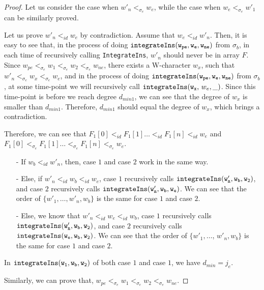 \begin {proof}
Let us consider the case when $w'_n <_{\sigma_e} w_e$, while the case when $w_e <_{\sigma_e} w'_1$ can be similarly proved.

Let us prove $w'_n <_{id} w_e$ by contradiction. Assume that $w_e <_{id} w'_n$. Then, it is easy to see that, in the process of doing $\alabelshort[{\tt integrateIns}]{w_{pe},w_e,w_{ne}}$ from $\sigma_b$, in each time of recursively calling {\tt IntegrateIns}, $w'_n$ should never be in array $F$. Since $w_{pe} <_{\sigma_e} w_1 <_{\sigma_e} w_2 <_{\sigma_e} w_{ne}$, there exists a W-character $w_x$, such that $w'_n <_{\sigma_e} w_x <_{\sigma_e} w_e$, and in the process of doing $\alabelshort[{\tt integrateIns}]{w_{pe},w_e,w_{ne}}$ from $\sigma_b$, at some time-point we will recursively call $\alabelshort[{\tt integrateIns}]{w_x$, $w_e,\_}$. Since this time-point is before we reach degree $d_{min1}$, we can see that the degree of $w_x$ is smaller than $d_{min1}$. Therefore, $d_{min1}$ should equal the degree of $w_x$, which brings a contradiction.

Therefore, we can see that $F_1[0] <_{id} F_1[1] \ldots <_{id} F_1[n] <_{id} w_e$ and $F_1[0] <_{\sigma_e} F_1[1] \ldots <_{\sigma_e} F_1[n] <_{\sigma_e} w_e$.

\begin{itemize}
\setlength{\itemsep}{0.5pt}
\item[-] If $w_b <_{id} w'_n$, then, case $1$ and case $2$ work in the same way.

\item[-] Else, if $w'_n <_{id} w_b <_{id} w_e$, case $1$ recursively calls $\alabelshort[{\tt integrateIns}]{w'_n,w_b,w_2}$, and case $2$ recursively calls $\alabelshort[{\tt integrateIns}]{w'_n,w_b,w_e}$. We can see that the order of $\{ w'_1,\ldots,w'_n,w_b \}$ is the same for case $1$ and case $2$.

\item[-] Else, we know that $w'_n <_{id} w_e <_{id} w_b$, case $1$ recursively calls $\alabelshort[{\tt integrateIns}]{w'_n,w_b,w_2}$, and case $2$ recursively calls $\alabelshort[{\tt integrateIns}]{w_e,w_b,w_2}$. We can see that the order of $\{ w'_1,\ldots$, $w'_n,w_b \}$ is the same for case $1$ and case $2$.
\end{itemize}


 In $\alabelshort[{\tt integrateIns}]{w_1,w_b,w_2}$ of both case $1$ and case $1$, we have $d_{min} = j_e$.

Similarly, we can prove that, $w_{pe} <_{\sigma_e} w_1 <_{\sigma_e} w_2 <_{\sigma_e} w_{ne}$.


\end{proof}
